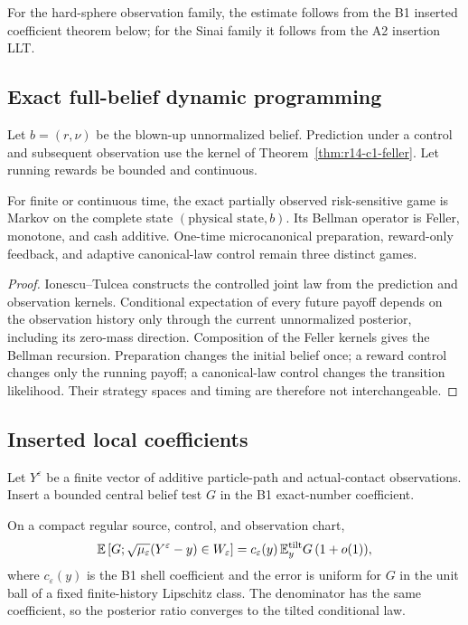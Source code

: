 For the hard-sphere observation family, the estimate follows from the B1
inserted coefficient theorem below; for the Sinai family it follows from the
A2 insertion LLT.

\subsection{Exact full-belief dynamic programming}

Let \(b=(r,\nu)\) be the blown-up unnormalized belief.  Prediction under a
control and subsequent observation use the kernel of
Theorem~\ref{thm:r14-c1-feller}.  Let running rewards be bounded and
continuous.

\begin{theorem}
\label{thm:r14-c1-game}
For finite or continuous time, the exact partially observed risk-sensitive
game is Markov on the complete state \((\text{physical state},b)\).  Its
Bellman operator is Feller, monotone, and cash additive.  One-time
microcanonical preparation, reward-only feedback, and adaptive canonical-law
control remain three distinct games.
\end{theorem}

\begin{proof}
Ionescu--Tulcea constructs the controlled joint law from the prediction and
observation kernels.  Conditional expectation of every future payoff depends
on the observation history only through the current unnormalized posterior,
including its zero-mass direction.  Composition of the Feller kernels gives
the Bellman recursion.  Preparation changes the initial belief once; a
reward control changes only the running payoff; a canonical-law control
changes the transition likelihood.  Their strategy spaces and timing are
therefore not interchangeable.
\end{proof}

\subsection{Inserted local coefficients}

Let \(Y^\varepsilon\) be a finite vector of additive particle-path and
actual-contact observations.  Insert a bounded central belief test \(G\) in
the B1 exact-number coefficient.

\begin{theorem}
\label{thm:r14-c1-inserted}
On a compact regular source, control, and observation chart,
\[
 \mathbb E\left[
 G;\sqrt{\mu_\varepsilon}
 (Y^\varepsilon-y)\in W_\varepsilon
 \right]
 =
 c_\varepsilon(y)\,
 \mathbb E_{y}^{\rm tilt}G\,(1+o(1)),
\]
where \(c_\varepsilon(y)\) is the B1 shell coefficient and the error is
uniform for \(G\) in the unit ball of a fixed finite-history Lipschitz class.
The denominator has the same coefficient, so the posterior ratio converges
to the tilted conditional law.
\end{theorem}

